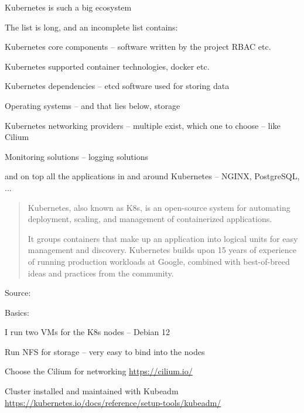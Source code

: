 \documentclass[Screen16to9,17pt]{foils}
\begin{document}
\begin{list1}
\item Kubernetes is such a big ecosystem
\item The list is long, and an incomplete list contains:
\begin{list2}
\item Kubernetes core components -- software written by the project RBAC etc.
\item Kubernetes supported container technologies, docker etc.
\item Kubernetes dependencies -- etcd software used for storing data
\item Operating systems -- and that lies below, storage
\item Kubernetes networking providers -- multiple exist, which one to choose -- like Cilium
\item Monitoring solutions -- logging solutions
\end{list2}
\item and on top all the applications in and around Kubernetes -- NGINX, PostgreSQL, ...
\end{list1}




\begin{quote}
Kubernetes, also known as K8s, is an open-source system for automating deployment, scaling, and management of containerized applications.

It groups containers that make up an application into logical units for easy management and discovery. Kubernetes builds upon 15 years of experience of running production workloads at Google, combined with best-of-breed ideas and practices from the community.
\end{quote}
Source: 

Basics:
\begin{list2}
\item I run two VMs for the K8s nodes -- Debian 12
\item Run NFS for storage -- very easy to bind into the nodes
\item Choose the Cilium for networking \url{https://cilium.io/}
\item Cluster installed and maintained with Kubeadm \url{https://kubernetes.io/docs/reference/setup-tools/kubeadm/}
\end{list2}


\end{document}

